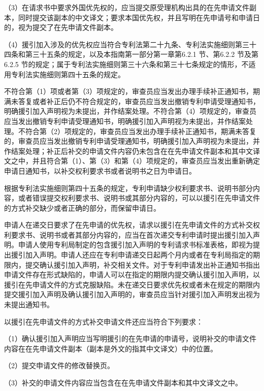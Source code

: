 （3）在请求书中要求外国优先权的，应当提交原受理机构出具的在先申请文件副本，同时提交该副本的中文译文；要求本国优先权，并且写明在先申请号和申请日的，视为提交了在先申请文件副本。

（4）援引加入涉及的优先权应当符合专利法第二十九条、专利法实施细则第三十四条和第三十五条的规定，以及本指南第一部分第一章第6.2.1 节、第6.2.2 节及第6.2.5 节的规定；属于专利法实施细则第三十六条和第三十七条规定的情形，不适用专利法实施细则第四十五条的规定。

不符合第（1）项或者第（3）项规定的，审查员应当发出办理手续补正通知书，期满未答复或者补正后仍不符合规定的，审查员应当发出撤销专利申请受理通知书，明确援引加入声明视为未提出，并作结案处理。不符合第（4）项规定的，审查员应当发出撤销专利申请受理通知书，明确援引加入声明视为未提出，并作结案处理。不符合第（2）项规定的，审查员应当发出办理手续补正通知书，期满未答复的，审查员应当发出撤销专利申请受理通知书，明确援引加入声明视为未提出，并作结案处理；补正后补交的申请文件内容仍未包含在在先申请文件副本和其中文译文之中，并且符合第（1）、第（3）和第（4）项规定的，审查员应当发出重新确定申请日通知书，以补交权利要求书或者说明书之日为申请日。

根据专利法实施细则第四十五条的规定，专利申请缺少权利要求书、说明书部分内容，或者错误提交权利要求书、说明书或其部分内容的，可以以援引在先申请文件的方式补交缺少或者正确的部分，而保留申请日。

申请人在递交日要求了在先申请的优先权，请求以援引在先申请文件的方式补交权利要求书、说明书或者其部分内容的，应当在首次递交专利申请时提出援引加入声明。申请人使用专利局制定的包含援引加入声明的专利请求书标准表格，即视为提出援引加入声明。申请人还应在专利申请递交日起两个月内或者在专利局指定的期限内，提交确认援引加入声明，补交相关文件。对于专利申请发出补正通知书指出申请文件存在形式缺陷的，申请人可以在指定的期限内提交确认援引加入声明，以援引在先申请文件的方式克服缺陷。未在递交日要求优先权或者未在规定的期限内提交援引加入声明及确认援引加入声明的，审查员应当针对援引加入声明发出视为未提出通知书。

以援引在先申请文件的方式补交申请文件还应当符合下列要求：

（1）确认援引加入声明应当写明援引的在先申请的申请号，说明补交的申请文件内容在在先申请文件副本（副本是外文的指其中文译文）中的位置。

（2）提交申请文件的修改替换页。

（3）补交的申请文件内容应当包含在在先申请文件副本和其中文译文之中。

